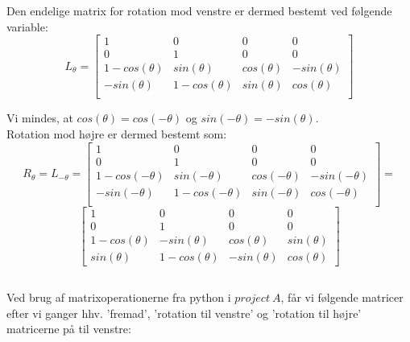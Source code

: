 \documentclass[a4paper,12pt]{article}
\begin{document}
Den endelige matrix for rotation mod venstre er dermed bestemt ved følgende variable:\\
\[
L_\theta
=
\left[\begin{array}{cccc}
    1 & 0 & 0 & 0\\
    0 & 1 & 0 & 0\\
    1 - cos(\theta) & sin(\theta) & cos(\theta) &  -sin(\theta)\\
    -sin(\theta) & 1 - cos(\theta) & sin(\theta) & cos(\theta)\\
\end{array}\right]
\]

Vi mindes, at $cos(\theta) = cos(-\theta)$ og $sin(-\theta) = -sin(\theta)$.\\
Rotation mod højre er dermed bestemt som:\\

\[
R_\theta = L_{-\theta}=
\left[\begin{array}{cccc}
    1 & 0 & 0 & 0\\
    0 & 1 & 0 & 0\\
    1 - cos(-\theta) & sin(-\theta) & cos(-\theta) &  -sin(-\theta)\\
    -sin(-\theta) & 1 - cos(-\theta) & sin(-\theta) & cos(-\theta)\\
\end{array}\right]
=
\]
\[
\left[\begin{array}{cccc}
    1 & 0 & 0 & 0 \\
    0 & 1 & 0 & 0 \\
    1 - cos(\theta) & -sin(\theta) & cos(\theta) &  sin(\theta)\\
    sin(\theta) & 1 - cos(\theta) & -sin(\theta) & cos(\theta)
\end{array}\right]
\]

\subsection{}
Ved brug af matrixoperationerne fra python i $project \ A$, får vi følgende matricer efter vi ganger hhv. 'fremad', 'rotation til venstre' og 'rotation til højre' matricerne på til venstre:\\
\end{document}

